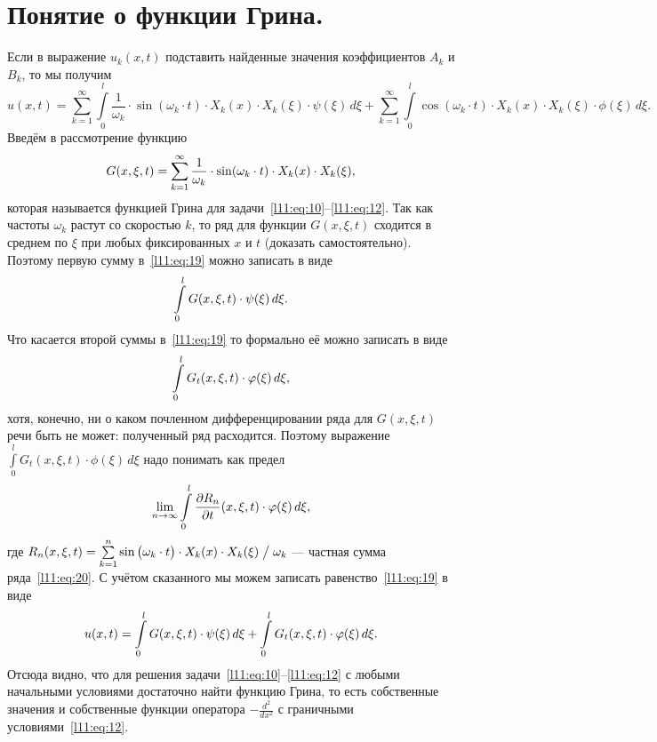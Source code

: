 \documentclass[12pt,a4paper,openany,fleqn]{book}
\newcommand{\dder}[2]{\ensuremath{\frac{d^2#1}{d#2^2}}}
\newcommand{\pder}[2]{\ensuremath{\frac{\partial#1}{\partial#2}}}
\theoremstyle{definition}
\begin{document}
\section{Понятие о функции Грина.}
\label{lecture11section3}
Если в выражение $u_k(x,t)$ подставить найденные значения коэффициентов $A_k$ и  $B_k$, то мы получим
\begin{equation}
	\label{l11:eq:19}
	u(x,t)=\sum\limits_{k=1}^{\infty}\int\limits_0^l\frac{1}{\omega_k}\cdot\sin(\omega_k\cdot t)\cdot X_k(x)\cdot X_k(\xi)\cdot\psi(\xi)\,d\xi+ \sum\limits_{k=1}^{\infty}\int\limits_0^l\cos(\omega_k\cdot t)\cdot X_k(x)\cdot X_k(\xi)\cdot\phi(\xi)\,d\xi.
\end{equation}
Введём в рассмотрение функцию
\begin{equation}
	\label{l11:eq:20}
	\hfill G(x,\xi,t)=\sum\limits_{k=1}^{\infty}\frac{1}{\omega_k}\cdot\sin(\omega_k\cdot t)\cdot X_k(x)\cdot X_k(\xi),\hfill
\end{equation}
которая называется функцией Грина для задачи~\eqref{l11:eq:10}--\eqref{l11:eq:12}. Так как частоты $\omega_k$ растут со скоростью $k$, то ряд для функции $G(x,\xi,t)$ сходится в среднем по $\xi$ при любых фиксированных $x$ и $t$ (доказать самостоятельно). Поэтому первую сумму в~\eqref{l11:eq:19} можно записать в виде 
\begin{equation*}
	\hfill\int\limits_0^l G(x,\xi,t)\cdot\psi(\xi)\,d\xi.\hfill
\end{equation*}
Что касается второй суммы в~\eqref{l11:eq:19} то формально её можно записать в виде 
\begin{equation*}
	\hfill\int\limits_0^l G_t(x,\xi,t)\cdot\phi(\xi)\,d\xi,\hfill
\end{equation*}
хотя, конечно, ни о каком почленном дифференцировании ряда для $G(x,\xi,t)$ речи быть не может: полученный ряд расходится. Поэтому выражение $\int\limits_0^l G_t(x,\xi,t)\cdot\phi(\xi)\,d\xi$ надо понимать как предел 
\begin{equation*}
	\hfill\lim\limits_{n\to\infty}\int\limits_0^l\pder{R_n}{t}(x,\xi,t)\cdot\phi(\xi)\,d\xi,\hfill
\end{equation*}
где $R_n(x,\xi,t)=\sum\limits_{k=1}^n\sin\big(\omega_k\cdot t\big)\cdot X_k(x)\cdot X_k(\xi)\bigm/\omega_k$ --- частная сумма ряда~\eqref{l11:eq:20}. С учётом сказанного мы можем записать равенство~\eqref{l11:eq:19} в виде
\begin{equation}
	\label{l11:eq:21}
	\hfill u(x,t)=\int\limits_0^l G(x,\xi,t)\cdot\psi(\xi)\,d\xi+\int\limits_0^l G_t(x,\xi,t)\cdot\phi(\xi)\,d\xi.\hfill
\end{equation}
Отсюда видно, что для решения задачи~\eqref{l11:eq:10}--\eqref{l11:eq:12} с любыми начальными условиями достаточно найти функцию Грина, то есть собственные значения и собственные функции оператора $-\dder{}{x}$ с граничными условиями~\eqref{l11:eq:12}.
\end{document}
